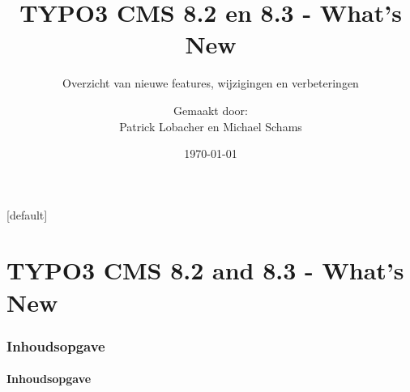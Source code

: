 \documentclass[t]{beamer}
\title{TYPO3 CMS 8.2 en 8.3 - What's New}
\subtitle{Overzicht van nieuwe features, wijzigingen en verbeteringen}
\author{
	\centerline{Gemaakt door:}
	\centerline{Patrick Lobacher en Michael Schams}
}
\date{\today}
\begin{document}
\sharefont


\begingroup
	[default]
	\begin{frame}
		\titlepage
	\end{frame}
\endgroup


\section*{TYPO3 CMS 8.2 and 8.3 - What's New}
\begin{frame}[fragile]
	\frametitle{Inhoudsopgave}
	\framesubtitle{Inhoudsopgave}

	\tableofcontents

\end{frame}










\end{document}
